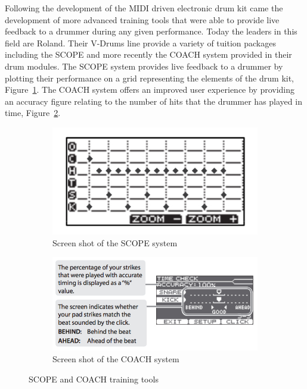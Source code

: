 \documentclass[a4paper, 11pt]{article}
\begin{document}
Following the development of the MIDI driven electronic drum kit came the development of more advanced training tools that were able to provide live feedback to a drummer during any given performance. Today the leaders in this field are Roland. Their V-Drums line provide a variety of tuition packages including the SCOPE and more recently the COACH system provided in their drum modules. The SCOPE system provides live feedback to a drummer by plotting their performance on a grid representing the elements of the drum kit, Figure~\ref{fig: scope}. The COACH system offers an improved user experience by providing an accuracy figure relating to the number of hits that the drummer has played in time, Figure~\ref{fig: coach}.
\begin{figure}[ht]
\centering
\begin{subfigure}{.5\textwidth}
  \centering
  \includegraphics[width=0.5\linewidth]{images/Scope.jpg}
  \caption{Screen shot of the SCOPE system}
  \label{fig: scope}
\end{subfigure}%
\begin{subfigure}{.5\textwidth}
  \centering
  \includegraphics[width=0.75\linewidth]{images/coach.jpg}
  \caption{Screen shot of the COACH system}
  \label{fig: coach}
\end{subfigure}
\caption{SCOPE and COACH training tools}
\label{fig: systems}
\end{figure}

\end{document}
